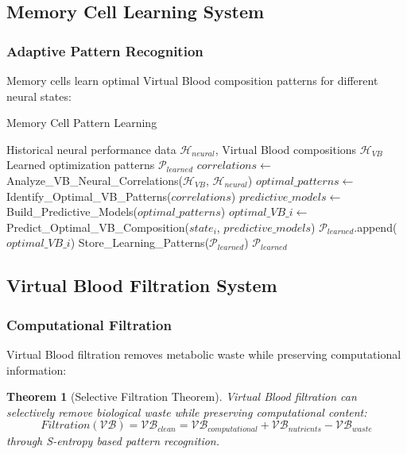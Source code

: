 \documentclass[12pt,a4paper]{article}
\newtheorem{theorem}{Theorem}
\begin{document}
\subsection{Memory Cell Learning System}

\subsubsection{Adaptive Pattern Recognition}

Memory cells learn optimal Virtual Blood composition patterns for different neural states:

\begin{algorithm}
\caption{Memory Cell Pattern Learning}
\begin{algorithmic}[1]
\REQUIRE Historical neural performance data $\mathcal{H}_{neural}$, Virtual Blood compositions $\mathcal{H}_{VB}$
\ENSURE Learned optimization patterns $\mathcal{P}_{learned}$
\STATE $correlations \leftarrow$ Analyze\_VB\_Neural\_Correlations($\mathcal{H}_{VB}$, $\mathcal{H}_{neural}$)
\STATE $optimal\_patterns \leftarrow$ Identify\_Optimal\_VB\_Patterns($correlations$)
\STATE $predictive\_models \leftarrow$ Build\_Predictive\_Models($optimal\_patterns$)
    \STATE $optimal\_VB\_i \leftarrow$ Predict\_Optimal\_VB\_Composition($state_i$, $predictive\_models$)
    \STATE $\mathcal{P}_{learned}$.append($optimal\_VB\_i$)
\ENDFOR
\STATE Store\_Learning\_Patterns($\mathcal{P}_{learned}$)
\RETURN $\mathcal{P}_{learned}$
\end{algorithmic}
\end{algorithm}

\subsection{Virtual Blood Filtration System}

\subsubsection{Computational Filtration}

Virtual Blood filtration removes metabolic waste while preserving computational information:

\begin{theorem}[Selective Filtration Theorem]
Virtual Blood filtration can selectively remove biological waste while preserving computational content:
\begin{equation}
Filtration(\mathcal{VB}) = \mathcal{VB}_{clean} = \mathcal{VB}_{computational} + \mathcal{VB}_{nutrients} - \mathcal{VB}_{waste}
\end{equation}
through S-entropy based pattern recognition.
\end{theorem}
\end{document}
